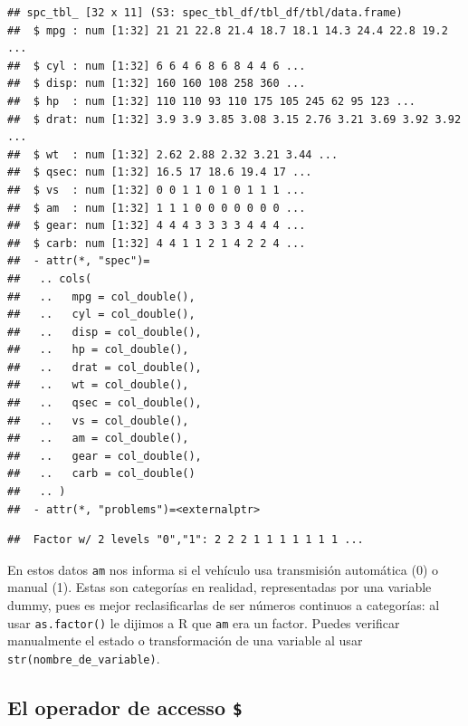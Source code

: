 \documentclass[
]{article}
\newenvironment{Shaded}{\begin{snugshade}}{\end{snugshade}}
\newcommand{\FunctionTok}[1]{\textcolor[rgb]{0.13,0.29,0.53}{\textbf{#1}}}
\newcommand{\NormalTok}[1]{#1}
\newcommand{\OtherTok}[1]{\textcolor[rgb]{0.56,0.35,0.01}{#1}}
\newcommand{\SpecialCharTok}[1]{\textcolor[rgb]{0.81,0.36,0.00}{\textbf{#1}}}
\begin{document}
\begin{verbatim}
## spc_tbl_ [32 x 11] (S3: spec_tbl_df/tbl_df/tbl/data.frame)
##  $ mpg : num [1:32] 21 21 22.8 21.4 18.7 18.1 14.3 24.4 22.8 19.2 ...
##  $ cyl : num [1:32] 6 6 4 6 8 6 8 4 4 6 ...
##  $ disp: num [1:32] 160 160 108 258 360 ...
##  $ hp  : num [1:32] 110 110 93 110 175 105 245 62 95 123 ...
##  $ drat: num [1:32] 3.9 3.9 3.85 3.08 3.15 2.76 3.21 3.69 3.92 3.92 ...
##  $ wt  : num [1:32] 2.62 2.88 2.32 3.21 3.44 ...
##  $ qsec: num [1:32] 16.5 17 18.6 19.4 17 ...
##  $ vs  : num [1:32] 0 0 1 1 0 1 0 1 1 1 ...
##  $ am  : num [1:32] 1 1 1 0 0 0 0 0 0 0 ...
##  $ gear: num [1:32] 4 4 4 3 3 3 3 4 4 4 ...
##  $ carb: num [1:32] 4 4 1 1 2 1 4 2 2 4 ...
##  - attr(*, "spec")=
##   .. cols(
##   ..   mpg = col_double(),
##   ..   cyl = col_double(),
##   ..   disp = col_double(),
##   ..   hp = col_double(),
##   ..   drat = col_double(),
##   ..   wt = col_double(),
##   ..   qsec = col_double(),
##   ..   vs = col_double(),
##   ..   am = col_double(),
##   ..   gear = col_double(),
##   ..   carb = col_double()
##   .. )
##  - attr(*, "problems")=<externalptr>
\end{verbatim}

\begin{Shaded}
\end{Shaded}

\begin{verbatim}
##  Factor w/ 2 levels "0","1": 2 2 2 1 1 1 1 1 1 1 ...
\end{verbatim}

En estos datos \texttt{am} nos informa si el vehículo usa transmisión
automática (0) o manual (1). Estas son categorías en realidad,
representadas por una variable dummy, pues es mejor reclasificarlas de
ser números continuos a categorías: al usar \texttt{as.factor()} le
dijimos a R que \texttt{am} era un factor. Puedes verificar manualmente
el estado o transformación de una variable al usar
\texttt{str(nombre\_de\_variable)}.

\subsection{\texorpdfstring{El operador de accesso
\texttt{\$}}{El operador de accesso \$}}\label{el-operador-de-accesso}
\end{document}
